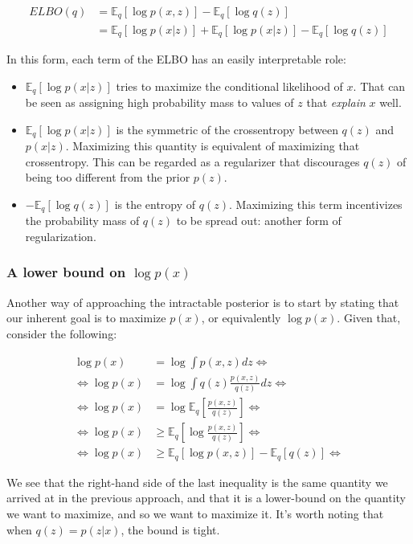 \begin{align}
    ELBO(q) &= \mathbb{E}_q [\log p(x, z)] - \mathbb{E}_q [\log q(z)] \\
            &= \mathbb{E}_q [\log p(x|z)] + \mathbb{E}_q [\log p(x|z)] - \mathbb{E}_q [\log q(z)]
\end{align}

In this form, each term of the ELBO has an easily interpretable role:
\begin{itemize}
    \item $\mathbb{E}_q [\log p(x|z)]$ tries to maximize the conditional likelihood of $x$. That
        can be seen as assigning high probability mass to values of $z$ that \emph{explain} $x$
        well.
    \item $\mathbb{E}_q [\log p(x|z)]$ is the symmetric of the crossentropy between
        $q(z)$ and $p(x|z)$. Maximizing this quantity is equivalent of maximizing
        that crossentropy. This can be regarded as a regularizer that discourages
        $q(z)$ of being too different from the prior $p(z)$.
    \item $ - \mathbb{E}_q [\log q(z)]$ is the entropy of $q(z)$. Maximizing
        this term incentivizes the probability mass of $q(z)$ to be spread out:
        another form of regularization.
\end{itemize}

\subsubsection{A lower bound on $\log p(x)$}
\label{subsubsection:elbo}

Another way of approaching the intractable posterior is to start by stating
that our inherent goal is to maximize $p(x)$, or equivalently $\log p(x)$. Given
that, consider the following:

\begin{align}
    \log p(x) &= \log \int p(x, z) dz \Leftrightarrow \\
    \Leftrightarrow \log p(x) &= \log \int q(z) \frac{p(x, z)}{q(z)} dz \Leftrightarrow \\
    \Leftrightarrow \log p(x) &= \log \mathbb{E}_q[\frac{p(x, z)}{q(z)}] \Leftrightarrow \\
    \Leftrightarrow \log p(x) &\geq \mathbb{E}_q[\log \frac{p(x, z)}{q(z)}] \Leftrightarrow \\
    \Leftrightarrow \log p(x) &\geq \mathbb{E}_q[\log p(x, z)] - \mathbb{E}_q[q(z)] \Leftrightarrow
\end{align}

We see that the right-hand side of the last inequality is the same quantity
we arrived at in the previous approach, and that it is a lower-bound on the
quantity we want to maximize, and so we want to maximize it. It's worth noting
that when $q(z) = p(z|x)$, the bound is tight.
